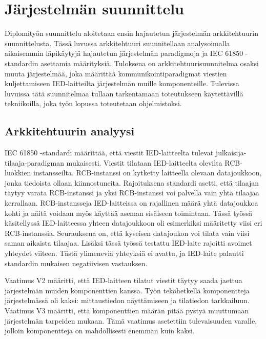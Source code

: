 \chapter{Järjestelmän suunnittelu}
\label{ch:architecture-planning}
Diplomityön suunnittelu aloitetaan ensin hajautetun järjestelmän arkkitehtuurin suunnittelusta. Tässä luvussa arkkitehtuuri suunnitellaan analysoimalla aikaisemmin läpikäytyjä hajautetun järjestelmän paradigmoja ja IEC 61850 -standardin asettamia määrityksiä. Tuloksena on arkkitehtuurisuunnitelma osaksi muuta järjestelmää, joka määrittää kommunikointiparadigmat viestien kuljettamiseen IED-laitteilta järjestelmän muille komponenteille. Tulevissa luvuissa tätä suunnitelmaa tullaan tarkentamaan toteutukseen käytettävillä tekniikoilla, joka työn lopussa toteutetaan ohjelmistoksi.


\section{Arkkitehtuurin analyysi}
\label{ch:architecture-analysis}
IEC 61850 -standardi määrittää, että viestit IED-laitteelta tulevat julkaisija-tilaaja-pa\-ra\-dig\-man mukaisesti. Viestit tilataan IED-laitteelta olevilta RCB-luokkien instansseilta. RCB-instanssi on kytketty laitteella olevaan datajoukkoon, jonka tiedoista ollaan kiinnostuneita. Rajoituksena standardi asetti, että tilaajan täytyy varata RCB-instanssi ja yksi RCB-instanssi voi palvella vain yhtä tilaajaa kerrallaan. RCB-instansseja IED-laitteissa on rajallinen määrä yhtä datajoukkoa kohti ja näitä voidaan myös käyttää aseman sisäiseen toimintaan. Tässä työssä käsitellyssä IED-laitteessa yhteen datajoukkoon oli esimerkiksi määritetty viisi eri RCB-instanssia. Seurauksena on, että kyseisen datajoukon voi tilata vain viisi saman aikaista tilaajaa. Lisäksi tässä työssä testattu IED-laite rajoitti avoimet yhteydet viiteen. Tästä ylimeneviä yhteyksiä ei avattu, ja IED-laite palautti standardin mukaisen negatiivisen vastauksen.

Vaatimus V2 määritti, että IED-laitteen tilatut viestit täytyy saada jaettua järjestelmän muiden komponenttien kanssa. Työn tekohetkellä komponentteja järjestelmässä oli kaksi: mittaustiedon näyttämiseen ja tilatiedon tarkkailuun. Vaatimus V3 määritti, että komponenttien määrän pitää pystyä muuttumaan järjestelmän tarpeiden mukaan. Tämä vaatimus asetettiin tulevaisuuden varalle, jolloin komponentteja on mahdollisesti enemmän kuin kaksi.

